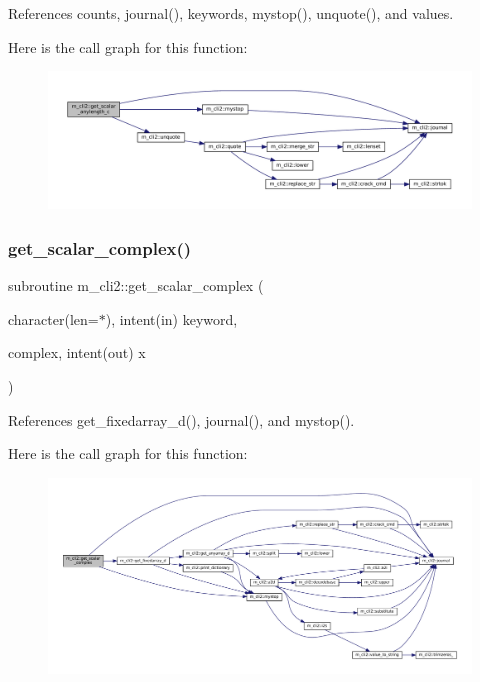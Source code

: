 References counts, journal(), keywords, mystop(), unquote(), and values.

Here is the call graph for this function\+:
\nopagebreak
\begin{figure}[H]
\begin{center}
\leavevmode
\includegraphics[width=350pt]{namespacem__cli2_a7429381c83a021ba3ffb32ed58e17a0e_cgraph}
\end{center}
\end{figure}
\mbox{\label{namespacem__cli2_a2af4dd786acb5cb2dbd6e43667109490}} 
\subsubsection{\texorpdfstring{get\+\_\+scalar\+\_\+complex()}{get\_scalar\_complex()}}
{\footnotesize\ttfamily subroutine m\+\_\+cli2\+::get\+\_\+scalar\+\_\+complex (\begin{DoxyParamCaption}\item[{character(len=$\ast$), intent(in)}]{keyword,  }\item[{complex, intent(out)}]{x }\end{DoxyParamCaption})\hspace{0.3cm}{\ttfamily [private]}}



References get\+\_\+fixedarray\+\_\+d(), journal(), and mystop().

Here is the call graph for this function\+:
\nopagebreak
\begin{figure}[H]
\begin{center}
\leavevmode
\includegraphics[width=350pt]{namespacem__cli2_a2af4dd786acb5cb2dbd6e43667109490_cgraph}
\end{center}
\end{figure}
\mbox{\label{namespacem__cli2_a338757660adde093db76b7d5559a1906}} 

